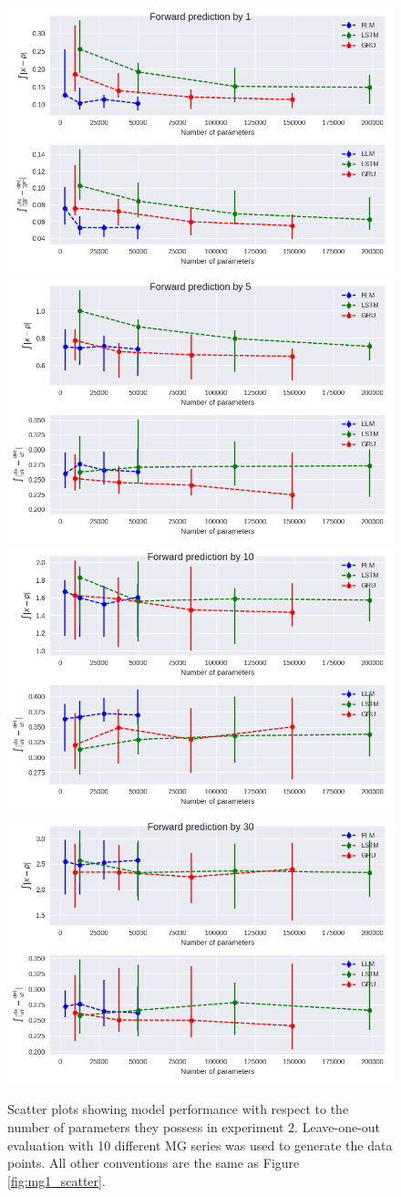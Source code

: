 \documentclass[11pt]{article}
\begin{document}
  \begin{figure}
    \begin{center}
  \includegraphics[width=.48\textwidth]{figures/mg2_scatter_1.png}
  \includegraphics[width=.48\textwidth]{figures/mg2_scatter_5.png}
  \includegraphics[width=.48\textwidth]{figures/mg2_scatter_10.png}
  \includegraphics[width=.48\textwidth]{figures/mg2_scatter_30.png}
       
    \caption{Scatter plots showing model performance with respect to
      the number of parameters they possess in experiment 2. Leave-one-out evaluation with 10 different MG series was used to generate the data points. All other conventions are the same as Figure \ref{fig:mg1_scatter}.}
    \label{fig:mg2_scatter}
    \end{center}
  \end{figure}
\end{document}
